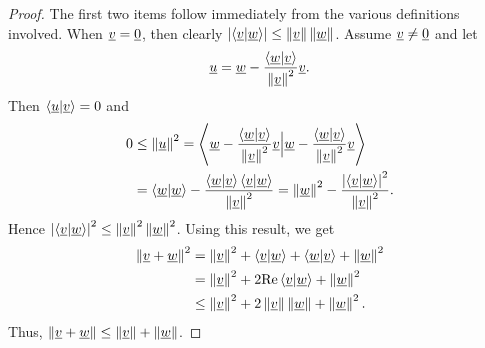 \begin{proof}
The first two items follow immediately from the various definitions involved.
When $\underline{v} = \underline{0}$, then clearly $\left| \left\langle \underline{v} | \underline{w} \right\rangle \right| \leq \left\| \underline{v} \right\| \left\| \underline{w} \right\|$.
Assume $\underline{v} \neq \underline{0}$ and let
\begin{equation*}
\underline{u} = \underline{w} - \frac{ \left\langle \underline{w} | \underline{v} \right\rangle}{ \left\| \underline{v} \right\|^2 } \underline{v}.
\end{equation*}
Then $\left\langle \underline{u} | \underline{v} \right\rangle = 0$ and
\begin{equation*}
\begin{split}
0 &\leq \left\| \underline{u} \right\|^2
= \left\langle \underline{w} - \frac{ \left\langle \underline{w} | \underline{v} \right\rangle}{ \left\| \underline{v} \right\|^2 } \underline{v} \Big|
\underline{w} - \frac{ \left\langle \underline{w} | \underline{v} \right\rangle}{ \left\| \underline{v} \right\|^2 } \underline{v} \right\rangle \\
&= \left\langle \underline{w} | \underline{w} \right\rangle
- \frac{ \left\langle \underline{w} | \underline{v} \right\rangle
\left\langle \underline{v} | \underline{w} \right\rangle }
{ \left\| \underline{v} \right\|^2 }
= \left\| \underline{w} \right\|^2
- \frac{ \left| \left\langle \underline{v} | \underline{w} \right\rangle \right|^2 }
{ \left\| \underline{v} \right\|^2 } .
\end{split}
\end{equation*}
Hence
$\left| \left\langle \underline{v} | \underline{w} \right\rangle \right|^2 \leq \left\| \underline{v} \right\|^2 \left\| \underline{w} \right\|^2$.
Using this result, we get
\begin{equation*}
\begin{split}
\left\| \underline{v} + \underline{w} \right\|^2
&= \left\| \underline{v} \right\|^2 + \left\langle \underline{v} | \underline{w} \right\rangle + \left\langle \underline{w} | \underline{v} \right\rangle + \left\| \underline{w} \right\|^2 \\
&= \left\| \underline{v} \right\|^2 + 2 \mathrm{Re} \left\langle \underline{v} | \underline{w} \right\rangle + \left\| \underline{w} \right\|^2 \\
&\leq \left\| \underline{v} \right\|^2 + 2 \left\| \underline{v} \right\| \left\| \underline{w} \right\| + \left\| \underline{w} \right\|^2 .
\end{split}
\end{equation*}
Thus, $\left\| \underline{v} + \underline{w} \right\| \leq \left\| \underline{v} \right\| + \left\| \underline{w} \right\|$.
\end{proof}

